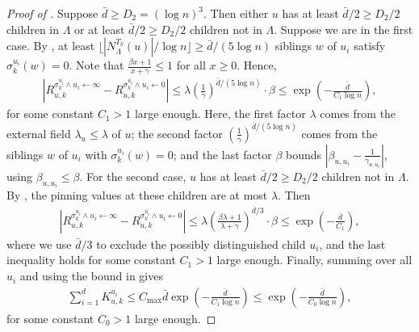 \documentclass[11pt]{amsart}
\newcommand{\tp}[1]{{\left( #1 \right)}}
\newcommand{\abs}[1]{\ensuremath{\left\vert#1\right\vert}}
\theoremstyle{definition}
\theoremstyle{remark}
\begin{document}
\begin{proof}[Proof of ]
Suppose $\bar d \geq D_2 = (\log n)^3$. 
Then either $u$ has at least $\bar d / 2 \geq D_2/2$ children in $\Lambda$ or at least $\bar d / 2 \geq D_2/2$ children not in $\Lambda$. Suppose we are in the first case.
By , at least $\lfloor |N^{T_k}_\Lambda(u)|/\log n \rfloor \geq \bar d/(5 \log n)$ siblings $w$ of $u_i$ satisfy $\sigma^{u_i}_k(w) = 0$.
Note that $\frac{\beta x + 1}{x + \gamma} \leq 1$ for all $x \geq 0$. Hence,
\begin{align*}
    \abs{R_{u,k}^{\sigma^{u_i}_k \land u_i \gets \infty} - R_{u,k}^{\sigma^{u_i}_k \land u_i \gets 0}} \leq \lambda \tp{\frac{1}{\gamma}}^{\bar d/(5 \log n)} \cdot \beta \leq \exp \tp{-\frac{\bar d}{C_1 \log n}}, 
\end{align*}
for some constant $C_1 > 1$ large enough. Here, the first factor $\lambda$ comes from the external field $\lambda_u \leq \lambda$ of $u$; the second factor $(\frac{1}{\gamma})^{\bar d/(5 \log n)}$ comes from the siblings $w$ of $u_i$ with $\sigma^{u_i}_k(w) = 0$; and the last factor $\beta$ bounds $\left|\beta_{u,u_i} - \frac{1}{\gamma_{u,u_i}}\right|$, using $\beta_{u,u_i}\leq \beta$. 
For the second case, $u$ has at least $\bar d / 2 \geq D_2/2$ children not in $\Lambda$. By , the pinning values at these children are at most $\lambda$. Then
\begin{align*}
    \abs{R_{u,k}^{\sigma^{u_i}_k \land u_i \gets \infty} - R_{u,k}^{\sigma^{u_i}_k \land u_i \gets 0}} \leq \lambda \tp{\frac{\beta \lambda + 1}{\lambda + \gamma}}^{\bar d/3} \cdot \beta \leq \exp \tp{-\frac{\bar d}{C_1}}, 
\end{align*}
where we use $\bar d/3$ to exclude the possibly distinguished child $u_i$, and the last inequality holds for some constant $C_1 > 1$ large enough. 
Finally, summing over all $u_i$ and using the bound in  gives 
\begin{align*}
    \sum_{i=1}^{d} K_{u,k}^{u_i} \leq C_{\max} \bar d \exp \tp{-\frac{\bar d}{C_1 \log n}} \leq \exp\tp{-\frac{\bar d}{C_0 \log n}},
\end{align*}
for some constant $C_0 > 1$ large enough.
\end{proof}
\end{document}
